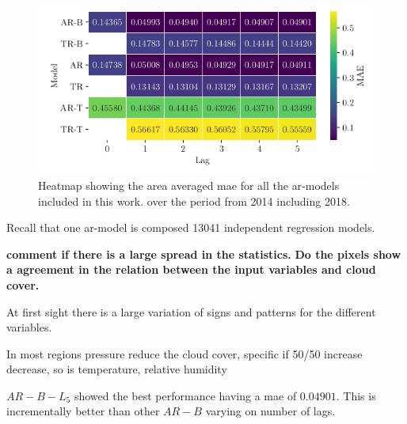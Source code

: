 \begin{figure}
    \centering
    \includegraphics{python_figs/heat_ar_model_mae_test_score.png}
    \caption{Heatmap showing the area averaged \acrshort{mae} for all the \acrshort{ar}-models included in this work. over the period from 2014 including 2018.}
    \label{fig:heatmap_ar_models}
\end{figure}

Recall that one \acrshort{ar}-model is composed 13041 independent regression models.

\textbf{comment if there is a large spread in the statistics.} \textbf{Do the pixels show a agreement in the relation between the input variables and cloud cover.}

At first sight there is a large variation of signs and patterns for the different variables. 

In most regions pressure reduce the cloud cover, specific if 50/50 increase decrease, so is temperature, relative humidity 

$AR-B-L_5$ showed the best performance having a \acrshort{mae} of $0.04901$. This is incrementally better than other $AR-B$ varying on number of lags. 

